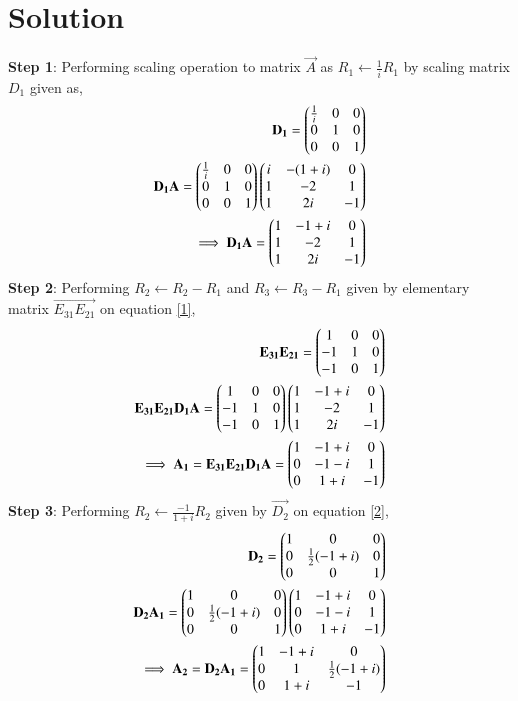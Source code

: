 \documentclass[journal,12pt,twocolumn]{IEEEtran}
\begin{document}
\section{Solution}
\textbf{Step 1}: Performing scaling operation to matrix $\vec{A}$ as $R_1\leftarrow \frac{1}{i}R_1$ by scaling matrix $D_1$ given as,
\begin{align}
\mathbf{D_1} = \begin{pmatrix}\frac{1}{i}&0&0\\0&1&0\\0&0&1\end{pmatrix}\\
\mathbf{D_1A} = \begin{pmatrix}\frac{1}{i}&0&0\\0&1&0\\0&0&1\end{pmatrix}\begin{pmatrix}i&-(1+i)&0\\1&-2&1\\1&2i&-1\end{pmatrix}\\
\implies\mathbf{D_1A} = \begin{pmatrix}1&-1+i&0\\1&-2&1\\1&2i&-1\end{pmatrix}\label{1}
\end{align}
\textbf{Step 2}: Performing $R_2 \leftarrow R_2-R_1$ and $R_3 \leftarrow R_3-R_1$ given by elementary matrix $\vec{E_{31}E_{21}}$ on equation \eqref{1},
\begin{align}
\mathbf{E_{31}E_{21}} = \begin{pmatrix}1&0&0\\-1&1&0\\-1&0&1\end{pmatrix}\\
\mathbf{E_{31}E_{21}D_1A} = \begin{pmatrix}1&0&0\\-1&1&0\\-1&0&1\end{pmatrix}\begin{pmatrix}1&-1+i&0\\1&-2&1\\1&2i&-1\end{pmatrix}\\
\implies\mathbf{A_1} = \mathbf{E_{31}E_{21}D_1A} = \begin{pmatrix}1&-1+i&0\\0&-1-i&1\\0&1+i&-1\end{pmatrix}\label{2}
\end{align}
\textbf{Step 3}: Performing $R_2\leftarrow \frac{-1}{1+i}R_2$ given by $\vec{D_2}$ on equation \eqref{2},
\begin{align}
\mathbf{D_2} = \begin{pmatrix}1&0&0\\0&\frac{1}{2}(-1+i)&0\\0&0&1\end{pmatrix}\\
\mathbf{D_2A_1} = \begin{pmatrix}1&0&0\\0&\frac{1}{2}(-1+i)&0\\0&0&1\end{pmatrix}\begin{pmatrix}1&-1+i&0\\0&-1-i&1\\0&1+i&-1\end{pmatrix}\\
\implies \mathbf{A_2}=\mathbf{D_2A_1} = \begin{pmatrix}1&-1+i&0\\0&1&\frac{1}{2}(-1+i)\\0&1+i&-1\end{pmatrix}\label{3}
\end{align}
\end{document}
